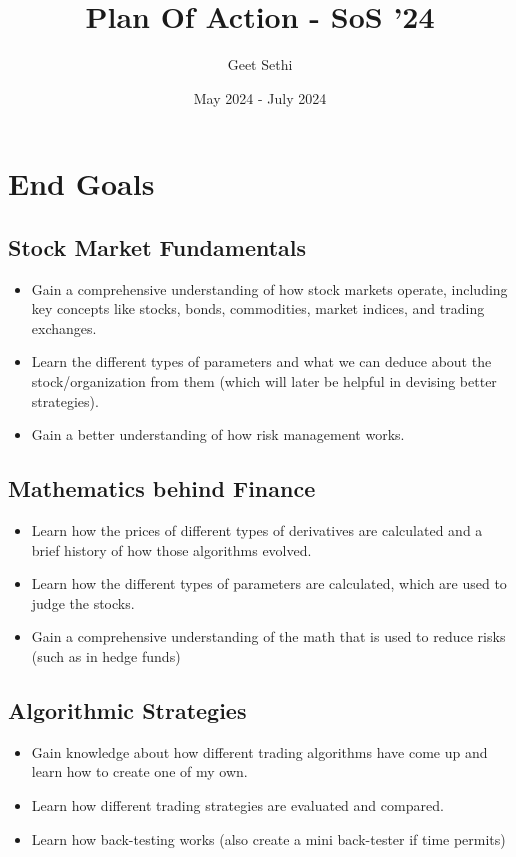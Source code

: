 \documentclass[12pt, letterpaper]{article}
\title{Plan Of Action - SoS '24}
\author{Geet Sethi}
\date{May 2024 - July 2024}
\begin{document}
\maketitle

\section{End Goals}

\subsection{Stock Market Fundamentals}
\begin{itemize}
    \item Gain a comprehensive understanding of how stock markets operate, including key concepts like stocks, bonds, commodities, market indices, and trading exchanges.
    \item Learn the different types of parameters and what we can deduce about the stock/organization from them (which will later be helpful in devising better strategies).
    \item Gain a better understanding of how risk management works.
\end{itemize}

\subsection{Mathematics behind Finance}
\begin{itemize}
    \item Learn how the prices of different types of derivatives are calculated and a brief history of how those algorithms evolved.
    \item Learn how the different types of parameters are calculated, which are used to judge the stocks.
    \item Gain a comprehensive understanding of the math that is used to reduce risks (such as in hedge funds)
\end{itemize}

\subsection{Algorithmic Strategies}
\begin{itemize}
    \item Gain knowledge about how different trading algorithms have come up and learn how to create one of my own.
    \item Learn how different trading strategies are evaluated and compared.
    \item Learn how back-testing works (also create a mini back-tester if time permits)
\end{itemize}
\end{document}
